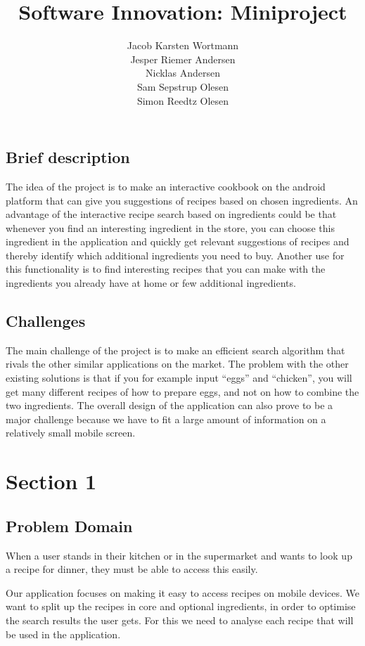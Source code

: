 \documentclass[a4paper,12pt]{memoir}
\title{Software Innovation: Miniproject}
\author{Jacob Karsten Wortmann\\Jesper Riemer Andersen\\Nicklas Andersen\\Sam Sepstrup Olesen\\Simon Reedtz Olesen}
\begin{document}
\maketitle

\section*{Brief description}
The idea of the project is to make an interactive cookbook on the android platform that can give you suggestions of recipes based on chosen ingredients. An advantage of the interactive recipe search based on ingredients could be that whenever you find an interesting ingredient in the store, you can choose this ingredient in the application and quickly get relevant suggestions of recipes and thereby identify which additional ingredients you need to buy. Another use for this functionality is to find interesting recipes that you can make with the ingredients you already have at home or few additional ingredients.

\section*{Challenges}
The main challenge of the project is to make an efficient search algorithm that rivals the other similar applications on the market. The problem with the other existing solutions is that if you for example input ``eggs'' and ``chicken'', you will get many different recipes of how to prepare eggs, and not on how to combine the two ingredients. The overall design of the application can also prove to be a major challenge because we have to fit a large amount of information on a relatively small mobile screen.

\chapter*{Section 1}

\section*{Problem Domain}

When a user stands in their kitchen or in the supermarket and wants to look up a recipe for dinner, they must be able to access this easily.

Our application focuses on making it easy to access recipes on mobile devices. We want to split up the recipes in core and optional ingredients, in order to optimise the search results the user gets. For this we need to analyse each recipe that will be used in the application.
\end{document}
